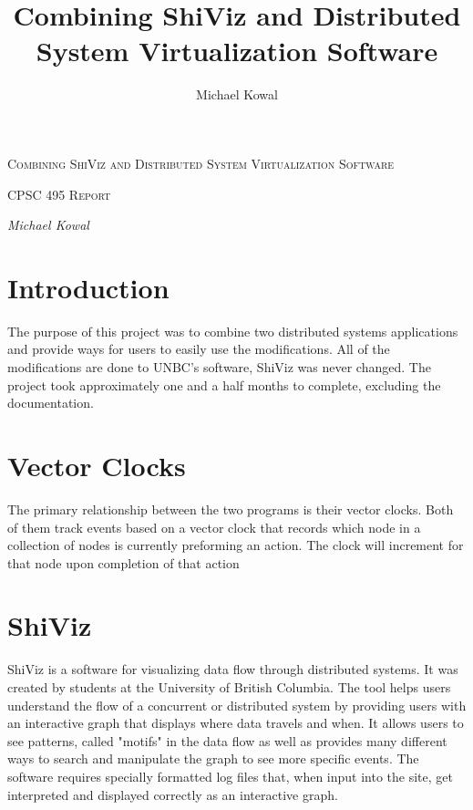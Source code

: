 \documentclass[12pt, oneside]{article}   	%
\title{Combining ShiViz and Distributed System Virtualization Software}
\author{Michael Kowal}
\begin{document}
\begin{titlepage}
	\centering
	\vspace{10cm}
	{\scshape\huge  Combining ShiViz and Distributed System Virtualization Software\par}
	\vspace{1.5cm}
	{\scshape\LARGE CPSC 495 Report\par}
	\vspace{1.5cm}
	{\Large\itshape Michael Kowal\par}
	\vfill
\end{titlepage}

\thispagestyle{empty}
\tableofcontents
\newpage
\clearpage
{} 
\setlength{\columnsep}{1 cm}
\begin{twocolumn}
\section{Introduction}

The purpose of this project was to combine two distributed systems applications and provide ways for users to easily use the modifications.  All of the modifications are done to UNBC's software, ShiViz was never changed.  The project took approximately one and a half months to complete, excluding the documentation.  

\section{Vector Clocks}

The primary relationship between the two programs is their vector clocks.  Both of them track events based on a vector clock that records which node in a collection of nodes is currently preforming an action.  The clock will increment for that node upon completion of that action

\section{ShiViz}

ShiViz is a software for visualizing data flow through distributed systems.  It was created by students at the University of British Columbia.  The tool helps users understand the flow of a concurrent or distributed system by providing users with an interactive graph that displays where data travels and when.  It allows users to see patterns, called "motifs" in the data flow as well as provides many different ways to search and manipulate the graph to see more specific events.  The software requires specially formatted log files that, when input into the site, get interpreted and displayed correctly as an interactive graph.


\end{twocolumn}
\end{document}
